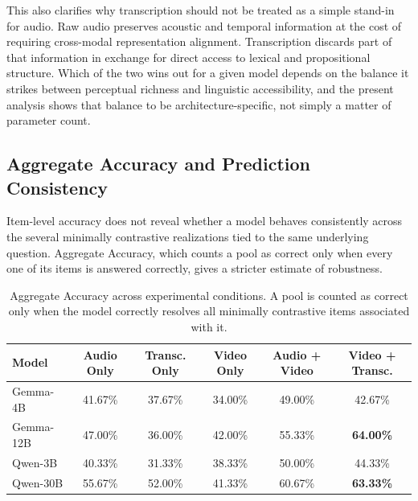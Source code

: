 This also clarifies why transcription should not be treated as a simple stand-in for audio. Raw audio preserves acoustic and temporal information at the cost of requiring cross-modal representation alignment. Transcription discards part of that information in exchange for direct access to lexical and propositional structure. Which of the two wins out for a given model depends on the balance it strikes between perceptual richness and linguistic accessibility, and the present analysis shows that balance to be architecture-specific, not simply a matter of parameter count.
\subsection*{Aggregate Accuracy and Prediction Consistency}
\label{subsec:aggregate_accuracy}
Item-level accuracy does not reveal whether a model behaves consistently across the several minimally contrastive realizations tied to the same underlying question. Aggregate Accuracy, which counts a pool as correct only when every one of its items is answered correctly, gives a stricter estimate of robustness.
\begin{table}[ht]
    \centering
    \small
    \begin{tabular}{lccccc}
        \hline
        \textbf{Model} &
        \textbf{Audio Only} &
        \textbf{Transc. Only} &
        \textbf{Video Only} &
        \textbf{Audio + Video} &
        \textbf{Video + Transc.} \\
        \hline

        Gemma-4B    &
        41.67\% &
        37.67\% &
        34.00\% &
        49.00\% &
        42.67\% \\

        Gemma-12B &
        47.00\% &
        36.00\% &
        42.00\% &
        55.33\% &
        \textbf{64.00\%} \\

        Qwen-3B &
        40.33\% &
        31.33\% &
        38.33\% &
        50.00\% &
        44.33\% \\

        Qwen-30B &
        55.67\% &
        52.00\% &
        41.33\% &
        60.67\% &
        \textbf{63.33\%} \\

        \hline
    \end{tabular}

    \caption{Aggregate Accuracy across experimental conditions. A pool is counted as correct only when the model correctly resolves all minimally contrastive items associated with it.}
    \label{tab:aggregate_accuracy}
\end{table}
